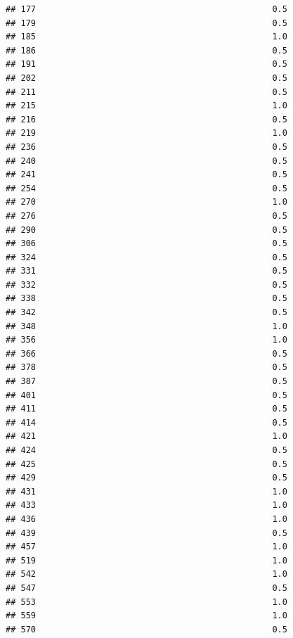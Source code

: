 \documentclass[
]{article}
\begin{document}
\begin{verbatim}
## 177                                               0.5
## 179                                               0.5
## 185                                               1.0
## 186                                               0.5
## 191                                               0.5
## 202                                               0.5
## 211                                               0.5
## 215                                               1.0
## 216                                               0.5
## 219                                               1.0
## 236                                               0.5
## 240                                               0.5
## 241                                               0.5
## 254                                               0.5
## 270                                               1.0
## 276                                               0.5
## 290                                               0.5
## 306                                               0.5
## 324                                               0.5
## 331                                               0.5
## 332                                               0.5
## 338                                               0.5
## 342                                               0.5
## 348                                               1.0
## 356                                               1.0
## 366                                               0.5
## 378                                               0.5
## 387                                               0.5
## 401                                               0.5
## 411                                               0.5
## 414                                               0.5
## 421                                               1.0
## 424                                               0.5
## 425                                               0.5
## 429                                               0.5
## 431                                               1.0
## 433                                               1.0
## 436                                               1.0
## 439                                               0.5
## 457                                               1.0
## 519                                               1.0
## 542                                               1.0
## 547                                               0.5
## 553                                               1.0
## 559                                               1.0
## 570                                               0.5

\end{verbatim}
\end{document}
